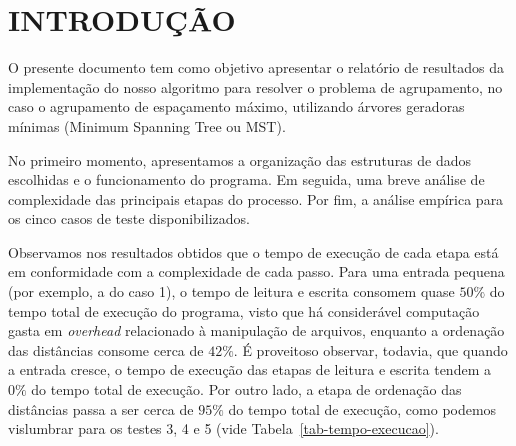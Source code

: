 \chapter*[INTRODUÇÃO]{INTRODUÇÃO}\label{cap-introducao} %

O presente documento tem como objetivo apresentar o relatório de resultados da implementação do nosso algoritmo para resolver o problema de agrupamento, no caso o agrupamento de espaçamento máximo, utilizando árvores geradoras mínimas (Minimum Spanning Tree ou MST).

No primeiro momento, apresentamos a organização das estruturas de dados escolhidas e o funcionamento do programa. Em seguida, uma breve análise de complexidade das principais etapas do processo. Por fim, a análise empírica para os cinco casos de teste disponibilizados.

Observamos nos resultados obtidos que o tempo de execução de cada etapa está em conformidade com a complexidade de cada passo. Para uma entrada pequena (por exemplo, a do caso 1), o tempo de leitura e escrita consomem quase $50\%$ do tempo total de execução do programa, visto que há considerável computação gasta em \emph{overhead} relacionado à manipulação de arquivos, enquanto a ordenação das distâncias consome cerca de $42\%$. É proveitoso observar, todavia, que quando a entrada cresce, o tempo de execução das etapas de leitura e escrita tendem a $0\%$ do tempo total de execução. Por outro lado, a etapa de ordenação das distâncias passa a ser cerca de $95\%$ do tempo total de execução, como podemos vislumbrar para os testes 3, 4 e 5 (vide Tabela~\ref{tab-tempo-execucao}). 